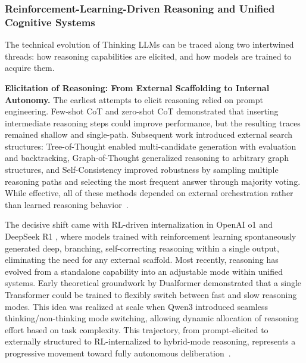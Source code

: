 \subsubsection{Reinforcement-Learning-Driven Reasoning and Unified Cognitive Systems}

The technical evolution of Thinking LLMs can be traced along two intertwined threads: how reasoning capabilities are elicited, and how models are trained to acquire them.

\textbf{Elicitation of Reasoning: From External Scaffolding to Internal Autonomy.} The earliest attempts to elicit reasoning relied on prompt engineering. Few-shot CoT \cite{wei2022chain} and zero-shot CoT \cite{kojima2022large} demonstrated that inserting intermediate reasoning steps could improve performance, but the resulting traces remained shallow and single-path. Subsequent work introduced external search structures: Tree-of-Thought \cite{yao2023tree} enabled multi-candidate generation with evaluation and backtracking, Graph-of-Thought \cite{besta2024graph} generalized reasoning to arbitrary graph structures, and Self-Consistency \cite{wang2022self} improved robustness by sampling multiple reasoning paths and selecting the most frequent answer through majority voting. While effective, all of these methods depended on external orchestration rather than learned reasoning behavior~\citep{liu2025fin,hayder2025highlighting,sun2025reinforcement,dong2025enhancing,ren2025deepseek,lin2023solving}.

The decisive shift came with RL-driven internalization in OpenAI o1 \cite{openai2024o1} and DeepSeek R1 \cite{deepseek2025r1}, where models trained with reinforcement learning spontaneously generated deep, branching, self-correcting reasoning within a single output, eliminating the need for any external scaffold. Most recently, reasoning has evolved from a standalone capability into an adjustable mode within unified systems. Early theoretical groundwork by Dualformer \cite{su2024dualformer} demonstrated that a single Transformer could be trained to flexibly switch between fast and slow reasoning modes. This idea was realized at scale when Qwen3 \cite{qwen2025qwen3} introduced seamless thinking/non-thinking mode switching, allowing dynamic allocation of reasoning effort based on task complexity. This trajectory, from prompt-elicited to externally structured to RL-internalized to hybrid-mode reasoning, represents a progressive movement toward fully autonomous deliberation~\citep{neha2025survey,du2025challenge,hou2025thinkprune,xu2026rlkd,yan2026distribution}.

